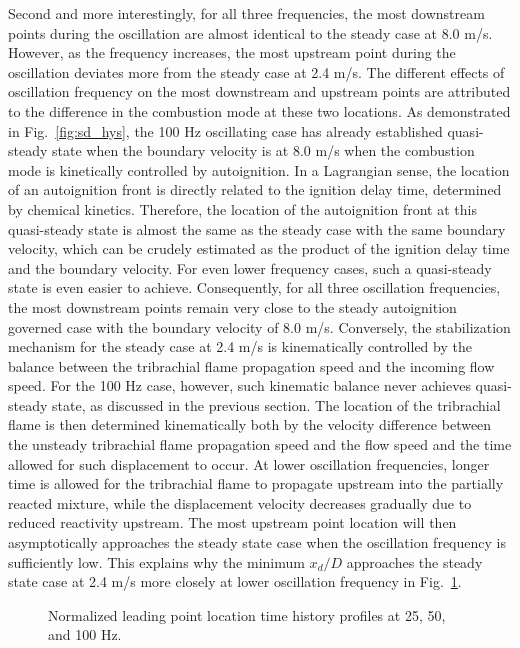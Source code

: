 \documentclass[review,3p,times]{elsarticle}
\begin{document}
\textcolor{Rev1}{Second and more interestingly, for all three frequencies, the most downstream points during the oscillation are almost identical to the steady case at 8.0 m/s.  However, as the frequency increases, the most upstream point during the oscillation deviates more from the steady case at 2.4 m/s.  The different effects of oscillation frequency on the most downstream and upstream points are attributed to the difference in the combustion mode at these two locations.  As demonstrated in Fig.~\ref{fig:sd_hys}, the 100 Hz oscillating case has already established quasi-steady state when the boundary velocity is at 8.0 m/s when the combustion mode is kinetically controlled by autoignition.  In a Lagrangian sense, the location of an autoignition front is directly related to the ignition delay time, determined by chemical kinetics.  Therefore, the location of the autoignition front at this quasi-steady state is almost the same as the steady case with the same boundary velocity, which can be crudely estimated as the product of the ignition delay time and the boundary velocity.  For even lower frequency cases, such a quasi-steady state is even easier to achieve.  Consequently, for all three oscillation frequencies, the most downstream points remain very close to the steady autoignition governed case with the boundary velocity of 8.0 m/s.  Conversely, the stabilization mechanism for the steady case at 2.4 m/s is kinematically controlled by the balance between the tribrachial flame propagation speed and the incoming flow speed.  For the 100 Hz case, however, such kinematic balance never achieves quasi-steady state, as discussed in the previous section.  The location of the tribrachial flame is then determined kinematically both by the velocity difference between the unsteady tribrachial flame propagation speed and the flow speed and the time allowed for such displacement to occur.  At lower oscillation frequencies, longer time is allowed for the tribrachial flame to propagate upstream into the partially reacted mixture, while the displacement velocity decreases gradually due to reduced reactivity upstream.  The most upstream point location will then asymptotically approaches the steady state case when the oscillation frequency is sufficiently low.  This explains why the minimum $x_d/D$ approaches the steady state case at 2.4 m/s more closely at lower oscillation frequency in Fig.~\ref{fig:xd_evo}.}

\begin{figure}[t]
  \centering
  \scriptsize
  \resizebox{0.5\textwidth}{!}{}
  \normalsize
  \caption{\textcolor{Rev1}{Normalized leading point location time history profiles at 25, 50, and 100 Hz.}}
  \label{fig:xd_evo}
\end{figure}
\end{document}
